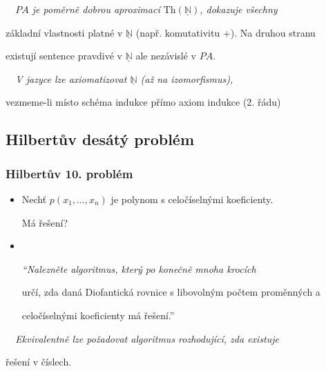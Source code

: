     {\it {}\ \ $PA$ je poměrně dobrou aproximací $\mathrm{Th}(\underline{\mathbb{N}})$, dokazuje všechny
    \smallskip
    
    základní vlastnosti platné v $\underline{\mathbb{N}}$ (např. komutativitu $+$). Na druhou stranu
    \smallskip
    
    existují sentence pravdivé v $\underline{\mathbb{N}}$ ale nezávislé v $PA$.}
    \bigskip
    
    {\it {}\ \ V jazyce  lze axiomatizovat $\underline{\mathbb{N}}$ (až na izomorfismus),
    \smallskip
    
    vezmeme-li místo schéma indukce přímo axiom indukce (2. řádu)}
    
    
    
    

\subsection{Hilbertův desátý problém}\todo

\subsubsection*{Hilbertův 10. problém}
    \begin{itemize}
    \item Nechť $p(x_1,\dots,x_n)$ je polynom s celočíselnými koeficienty.
    \smallskip
    
    Má    řešení?
    \smallskip
    
    \item {}\ \ {\it ``Nalezněte algoritmus, který po konečně mnoha krocích
    \smallskip
    
    určí, zda daná Diofantická rovnice s libovolným počtem proměnných a
    \smallskip
    
    celočíselnými koeficienty má  řešení.''}
    \end{itemize}
    \smallskip
    
    {\it {}\ \ Ekvivalentně lze požadovat algoritmus rozhodující, zda existuje
    \smallskip
    
    řešení v  číslech.}
    \medskip
    
